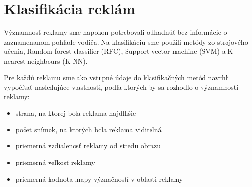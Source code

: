 \section{Klasifikácia reklám}

Významnosť reklamy sme napokon potrebovali odhadnúť bez informácie o zaznamenanom pohľade vodiča. Na klasifikáciu sme použili metódy zo strojového učenia, Random forest classifier (RFC), Support vector machine (SVM) a K-nearest neighbours (K-NN).

Pre každú reklamu sme ako vstupné údaje do klasifikačných metód navrhli vypočítať nasledujúce vlastnosti, podľa ktorých by sa rozhodlo o významnosti reklamy:

\begin{itemize}
  \item strana, na ktorej bola reklama najdlhšie
  \item počet snímok, na ktorých bola reklama viditeľná
  \item priemerná vzdialenosť reklamy od stredu obrazu
  \item priemerná veľkosť reklamy
  \item priemerná hodnota mapy význačností v oblasti reklamy
\end{itemize}

